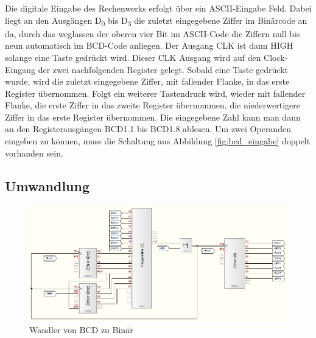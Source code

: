 \documentclass[a4paper,12pt,fleqn,oneside]{article}
\begin{document}
		\noindent
		Die digitale Eingabe des Rechenwerks erfolgt über ein ASCII-Eingabe Feld. Dabei liegt an den Ausgängen D\textsubscript{0} 
		bis D\textsubscript{3} die zuletzt eingegebene Ziffer im Binärcode an da, durch das weglassen der oberen vier Bit im 
		ASCII-Code die Ziffern null bis neun automatisch im BCD-Code anliegen. Der Ausgang CLK ist dann HIGH solange eine Taste 
		gedrückt wird. Dieser CLK Ausgang wird auf den Clock-Eingang der zwei nachfolgenden Register gelegt. Sobald eine Taste 
		gedrückt wurde, wird die zuletzt eingegebene Ziffer, mit fallender Flanke, in das erste Register übernommen. Folgt ein 
		weiterer Tastendruck wird, wieder mit fallender Flanke, die erste Ziffer in das zweite Register übernommen, die 
		niederwertigere Ziffer in das erste Register übernommen. Die eingegebene Zahl kann man dann an den Registerausgängen 
		BCD1.1 bis BCD1.8 ablesen. Um zwei Operanden eingeben zu können, muss die Schaltung aus Abbildung \ref{fig:bcd_eingabe} 
		doppelt vorhanden sein.


	

\newpage
	\subsection{Umwandlung}
		\begin{figure}[h]
			\center
			\includegraphics[width=1.0\textwidth]{wandler_dezimal_binaer}
			\caption{Wandler von BCD zu Binär}
			\label{fig:wandler_dezimal_binaer}
		\end{figure}
	
\end{document}
